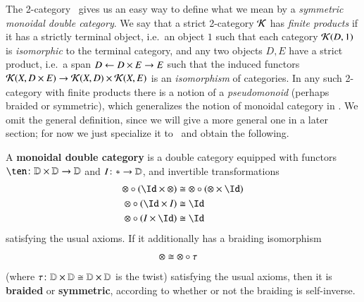 The 2-category \cDbl\ gives us an easy way to define what we mean by a
\emph{symmetric monoidal double category}.
We say that a strict 2-category $\mathcal{K}$ has \emph{finite products} if it has a strictly terminal object, i.e.\ an object $1$ such that each category $\mathcal{K}(D,1)$ is \emph{isomorphic} to the terminal category, and any two objects $D,E$ have a strict product, i.e.\ a span $D \leftarrow D\times E \to E$ such that the induced functors $\mathcal{K}(X,D\times E) \to \mathcal{K}(X,D) \times \mathcal{K}(X,E)$ is an \emph{isomorphism} of categories.
In any such 2-category with finite products there is a notion of a \emph{pseudomonoid} (perhaps braided or symmetric), which generalizes the notion of monoidal category in \cCat.
We omit the general definition, since we will give a more general one in a later section;
for now we just specialize it to \cDbl\ and obtain the following.

\begin{defn}\label{def:symmondoub}
  A \textbf{monoidal double category} is a double category equipped
  with functors $\ten\maps \lD\times\lD\to\lD$ and $I\colon * \to\mathbb{D}$,
  and invertible transformations
  \begin{align*}
    \mathord{\otimes} \circ (\Id\times \mathord{\otimes})
    &\iso \mathord{\otimes} \circ (\mathord{\otimes} \times \Id)\\
    \mathord{\otimes} \circ (\Id\times I) &\iso \Id\\
    \mathord{\otimes} \circ (I\times \Id) &\iso \Id
  \end{align*}
  satisfying the usual axioms.  If it additionally has a braiding
  isomorphism
  \begin{align*}
    \mathord{\otimes} &\cong \mathord{\otimes} \circ \tau
  \end{align*}
  (where $\tau\colon \mathbb{D}\times\mathbb{D}\cong \mathbb{D}\times\mathbb{D}$ is the twist)
  satisfying the usual axioms, then it is \textbf{braided} or
  \textbf{symmetric}, according to whether or not the braiding is
  self-inverse.
\end{defn}

